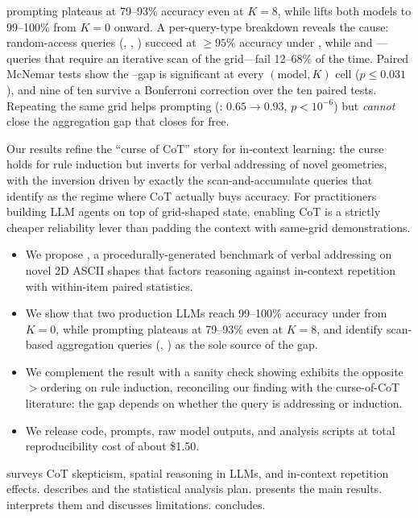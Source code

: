  \Direct prompting plateaus at 79--93\% accuracy
even at $K{=}8$, while \COT lifts both models to 99--100\% from $K{=}0$
onward. A per-query-type breakdown reveals the cause: random-access
queries (\qpoint, \qlookup, \qneighbor) succeed at $\ge 95\%$ accuracy
under \Direct, while \qcount and \qrowmax---queries that require an
iterative scan of the grid---fail 12--68\% of the time. Paired McNemar
tests show the \Direct--\COT gap is significant at every
$(\text{model}, K)$ cell ($p \le 0.031$), and nine of ten survive a
Bonferroni correction over the ten paired tests. Repeating the same grid
helps \Direct prompting (\haiku: $0.65 \to 0.93$, $p<10^{-6}$) but
\emph{cannot} close the aggregation gap that \COT closes for free.

 Our results refine the ``curse of CoT'' story
for in-context learning: the curse holds for rule induction but inverts
for verbal addressing of novel geometries, with the inversion driven by
exactly the scan-and-accumulate queries that \citet{sprague2025tocot}
identify as the regime where CoT actually buys accuracy. For
practitioners building LLM agents on top of grid-shaped state, enabling
CoT is a strictly cheaper reliability lever than padding the context
with same-grid demonstrations.

\begin{itemize}[leftmargin=*,itemsep=0pt,topsep=0pt]
    \item We propose \addrtask, a procedurally-generated benchmark of
    verbal addressing on novel 2D ASCII shapes that factors reasoning
    against in-context repetition with within-item paired statistics.
    \item We show that two production LLMs reach 99--100\% accuracy
    under \COT from $K{=}0$, while \Direct prompting plateaus at
    79--93\% even at $K{=}8$, and identify scan-based aggregation
    queries (\qcount, \qrowmax) as the sole source of the gap.
    \item We complement the result with a \miniarc sanity check showing
    \gpt exhibits the opposite \Direct${>}$\COT ordering on rule
    induction, reconciling our finding with the curse-of-CoT
    literature: the gap depends on whether the query is
    addressing or induction.
    \item We release code, prompts, raw model outputs, and analysis
    scripts at total reproducibility cost of about \$1.50.
\end{itemize}

 surveys CoT skepticism, spatial reasoning in LLMs,
and in-context repetition effects.  describes
\addrtask and the statistical analysis plan. 
presents the main results.  interprets them and
discusses limitations.  concludes.
